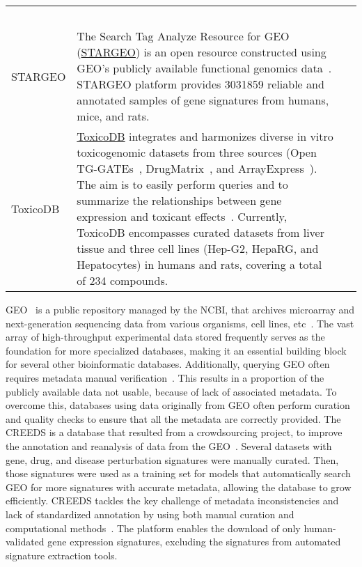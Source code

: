 \begin{newpdflayout}{210mm}{297mm}
\begin{center}
\begin{longtable}{@{} p{} p{} p{} @{}}
  ~\cite{RN88} \\
STARGEO &
  The Search Tag Analyze Resource for GEO (\href{http://stargeo.org/}{STARGEO}) is an open resource constructed using \gls{GEO}'s publicly available functional genomics data~\cite{RN98}. STARGEO platform provides 3031859 reliable and annotated samples of gene signatures from humans, mice, and rats. &
  ~\cite{RN127} \\
ToxicoDB &
  \href{http://www.toxicodb.ca/}{ToxicoDB} integrates and harmonizes diverse in vitro toxicogenomic datasets from three sources (Open TG-GATEs~\cite{RN120}, DrugMatrix~\cite{RN102}, and ArrayExpress~\cite{RN122}). The aim is to easily perform queries and to summarize the relationships between gene expression and toxicant effects~\cite{RN128}. Currently, ToxicoDB encompasses curated datasets from liver tissue and three cell lines (Hep-G2, HepaRG, and Hepatocytes) in humans and rats, covering a total of 234 compounds. &
  ~\cite{RN128} \\
\end{longtable}
\end{center}

\end{newpdflayout}

\gls{GEO}~\cite{RN98} is a public repository managed by the \gls{NCBI}, that archives microarray and next-generation sequencing data from various organisms, cell lines, etc~\cite{RN89}. The vast array of high-throughput experimental data stored frequently serves as the foundation for more specialized databases, making it an essential building block for several other bioinformatic databases. Additionally, querying \gls{GEO} often requires metadata manual verification~\cite{RN115}. This results in a proportion of the publicly available data not usable, because of lack of associated metadata. 
To overcome this, databases using data originally from \gls{GEO} often perform curation and quality checks to ensure that all the metadata are correctly provided. 
The \gls{CREEDS} is a database that resulted from a crowdsourcing project, to improve the annotation and reanalysis of data from the \gls{GEO}~\cite{RN87}. 
Several datasets with gene, drug, and disease perturbation signatures were manually curated. Then, those signatures were used as a training set for models that automatically search GEO for more signatures with accurate metadata, allowing the database to grow efficiently. \gls{CREEDS} tackles the key challenge of metadata inconsistencies and lack of standardized annotation by using both manual curation and computational methods~\cite{RN87}. The platform enables the download of only human-validated gene expression signatures, excluding the signatures from automated signature extraction tools.

